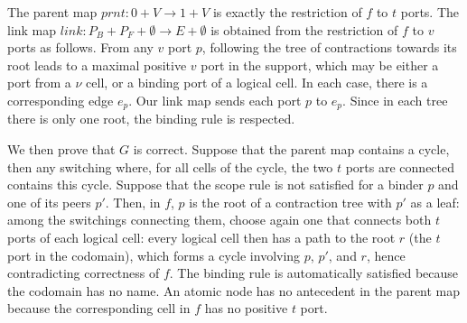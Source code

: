 \documentclass{llncs}
\newcommand{\prnt}{\mathit{prnt}}
\newcommand{\link}{\mathit{link}}
\begin{document}
  The parent map $\prnt: 0 + V \to 1 + V$ is exactly the restriction
  of $f$ to $t$ ports.  The link map $\link: P_B + P_F + \emptyset \to
  E + \emptyset$ is obtained from the restriction of $f$ to $v$ ports
  as follows. From any $v$ port $p$, following the tree of
  contractions towards its root leads to a maximal positive
  $v$ port in the support, which may be either a port from a $\nu$
  cell, or a binding port of a logical cell.  In each case, there is a
  corresponding edge $e_p$.  Our link map sends each port $p$ to
  $e_p$. Since in each tree there is only one root, the binding rule
  is respected.

  We then prove that $G$ is correct.  Suppose that the parent map
  contains a cycle, then any switching where, for all cells of the
  cycle, the two $t$ ports are connected contains this cycle.  Suppose
  that the scope rule is not satisfied for a binder $p$ and one of its
  peers $p'$. Then, in $f$, $p$ is the root of a contraction tree with
  $p'$ as a leaf: among the switchings connecting them, choose again
  one that connects both $t$ ports of each logical cell: every logical
  cell then has a path to the root $r$ (the $t$ port in the codomain),
  which forms a cycle involving $p$, $p'$, and $r$, hence
  contradicting correctness of $f$.  The binding rule is automatically
  satisfied because the codomain has no name.  An atomic node has no
  antecedent in the parent map because the corresponding cell in $f$
  has no positive $t$ port.
\end{document}
